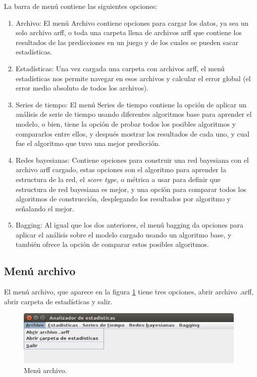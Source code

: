 La barra de menú contiene las siguientes opciones:
\renewcommand{\labelenumi}{$\bullet$ }
\renewcommand{\labelenumii}{$\bullet$ }
\begin{enumerate}
	\item Archivo: El menú Archivo contiene opciones para cargar los datos, ya sea un solo archivo arff, o toda una carpeta llena de archivos arff que contiene los resultados de las predicciones en un juego y de los cuales se pueden sacar estadísticas.
	\item Estadísticas: Una vez cargada una carpeta con archivos arff, el menú estadísticas nos permite navegar en esos archivos y calcular el error global (el error medio absoluto de todos los archivos).
	\item Series de tiempo: El menú Series de tiempo contiene la opción de aplicar un análisis de serie de tiempo usando diferentes algoritmos base para aprender el modelo, o bien, tiene la opción de probar todos los posibles algoritmos y compararlos entre ellos, y después mostrar los resultados de cada uno, y cual fue el algoritmo que tuvo una mejor predicción. 
	\item Redes bayesianas: Contiene opciones para construir una red bayesiana con el archivo arff cargado, estas opciones son el algoritmo para aprender la estructura de la red, el \textit{score type}, o métrica a usar para definir que estructura de red bayesiana es mejor, y una opción para comparar todos los algoritmos de construcción, desplegando los resultados por algoritmo y señalando el mejor.
	\item Bagging: Al igual que los dos anteriores, el menú bagging da opciones para aplicar el análisis sobre el modelo cargado usando un algoritmo base, y también ofrece la opción de comparar estos posibles algoritmos.
\end{enumerate}


\subsection{Menú archivo} \label{subsec:menuArchivo}
El menú archivo, que aparece en la figura \ref{fig:menuArchivo} tiene tres opciones, abrir archivo .arff, abrir carpeta de estadísticas y salir.
\begin{figure}[h]%
	\centering
	\includegraphics[width=12cm]{img/menuArchivo.png}
	\caption{Menú archivo.}
	\label{fig:menuArchivo}
\end{figure}


